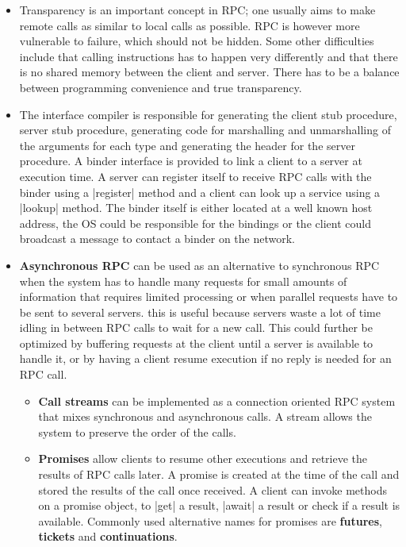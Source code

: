 \documentclass[a4paper]{article}
\begin{document}
\begin{itemize}
\begin{enumerate}
\end{enumerate}
\item Transparency is an important concept in RPC; one usually aims to make remote calls as similar to local calls as possible. RPC is however more vulnerable to failure, which should not be hidden. Some other difficulties include that calling instructions has to happen very differently and that there is no shared memory between the client and server. There has to be a balance between programming convenience and true transparency.
\item The interface compiler is responsible for generating the client stub procedure, server stub procedure, generating code for marshalling and unmarshalling of the arguments for each type and generating the header for the server procedure. A binder interface is provided to link a client to a server at execution time. A server can register itself to receive RPC calls with the binder using a |register| method and a client can look up a service using a |lookup| method. The binder itself is either located at a well known host address, the OS could be responsible for the bindings or the client could broadcast a message to contact a binder on the network.
\item \textbf{Asynchronous RPC} can be used as an alternative to synchronous RPC when the system has to handle many requests for small amounts of information that requires limited processing or when parallel requests have to be sent to several servers. this is useful because servers waste a lot of time idling in between RPC calls to wait for a new call. This could further be optimized by buffering requests at the client until a server is available to handle it, or by having a client resume execution if no reply is needed for an RPC call.
\begin{itemize}
\item \textbf{Call streams} can be implemented as a connection oriented RPC system that mixes synchronous and asynchronous calls. A stream allows the system to preserve the order of the calls.
\item \textbf{Promises} allow clients to resume other executions and retrieve the results of RPC calls later. A promise is created at the time of the call and stored the results of the call once received. A client can invoke methods on a promise object, to |get| a result, |await| a result or check if a result is available. Commonly used alternative names for promises are \textbf{futures}, \textbf{tickets} and \textbf{continuations}.
\end{itemize}
\end{itemize}
\end{document}
